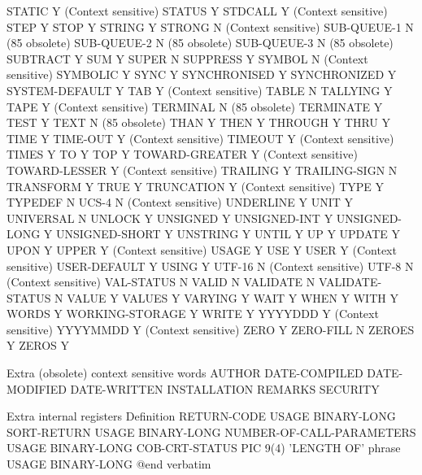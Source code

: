 STATIC				Y (Context sensitive)
STATUS				Y
STDCALL				Y (Context sensitive)
STEP				Y
STOP				Y
STRING				Y
STRONG				N (Context sensitive)
SUB-QUEUE-1			N (85 obsolete)
SUB-QUEUE-2			N (85 obsolete)
SUB-QUEUE-3			N (85 obsolete)
SUBTRACT			Y
SUM				Y
SUPER				N
SUPPRESS			Y
SYMBOL				N (Context sensitive)
SYMBOLIC			Y
SYNC				Y
SYNCHRONISED			Y
SYNCHRONIZED			Y
SYSTEM-DEFAULT			Y
TAB				Y (Context sensitive)
TABLE				N
TALLYING			Y
TAPE				Y (Context sensitive)
TERMINAL			N (85 obsolete)
TERMINATE			Y
TEST				Y
TEXT				N (85 obsolete)
THAN				Y
THEN				Y
THROUGH				Y
THRU				Y
TIME				Y
TIME-OUT			Y (Context sensitive)
TIMEOUT				Y (Context sensitive)
TIMES				Y
TO				Y
TOP				Y
TOWARD-GREATER			Y (Context sensitive)
TOWARD-LESSER			Y (Context sensitive)
TRAILING			Y
TRAILING-SIGN			N
TRANSFORM			Y
TRUE				Y
TRUNCATION			Y (Context sensitive)
TYPE				Y
TYPEDEF				N
UCS-4				N (Context sensitive)
UNDERLINE			Y
UNIT				Y
UNIVERSAL			N
UNLOCK				Y
UNSIGNED			Y
UNSIGNED-INT			Y
UNSIGNED-LONG			Y
UNSIGNED-SHORT			Y
UNSTRING			Y
UNTIL				Y
UP				Y
UPDATE				Y
UPON				Y
UPPER				Y (Context sensitive)
USAGE				Y
USE				Y
USER				Y (Context sensitive)
USER-DEFAULT			Y
USING				Y
UTF-16				N (Context sensitive)
UTF-8				N (Context sensitive)
VAL-STATUS			N
VALID				N
VALIDATE			N
VALIDATE-STATUS			N
VALUE				Y
VALUES				Y
VARYING				Y
WAIT				Y
WHEN				Y
WITH				Y
WORDS				Y
WORKING-STORAGE			Y
WRITE				Y
YYYYDDD				Y (Context sensitive)
YYYYMMDD			Y (Context sensitive)
ZERO				Y
ZERO-FILL			N
ZEROES				Y
ZEROS				Y

Extra (obsolete) context sensitive words
AUTHOR
DATE-COMPILED
DATE-MODIFIED
DATE-WRITTEN
INSTALLATION
REMARKS
SECURITY

Extra internal registers	Definition
RETURN-CODE			USAGE BINARY-LONG
SORT-RETURN			USAGE BINARY-LONG
NUMBER-OF-CALL-PARAMETERS	USAGE BINARY-LONG
COB-CRT-STATUS			PIC 9(4)
'LENGTH OF' phrase		USAGE BINARY-LONG
@end verbatim

